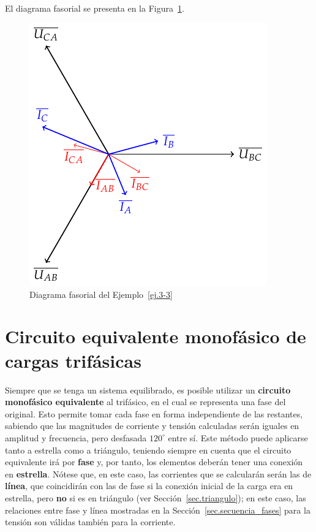 \begin{example}
\begin{align*}
          \end{align*}
          El diagrama fasorial se presenta en la
          Figura~\ref{fig.diagrama_ejemplo_3-3}.
          \begin{figure}[H]
            \centering \includegraphics{../figs/diagrama_3_3.pdf}
            \caption{Diagrama fasorial del Ejemplo~\ref{ej.3-3}}
            \label{fig.diagrama_ejemplo_3-3}
          \end{figure}
	\end{example}
	
	\section{Circuito equivalente monofásico de cargas trifásicas}\label{sec.c_eq_mon}
	 Siempre que se tenga un sistema equilibrado, es posible utilizar un \textbf{circuito monofásico equivalente} al trifásico, en el cual se representa una fase del original. Esto permite tomar cada fase en forma independiente de las restantes, sabiendo que las magnitudes de corriente y tensión calculadas serán iguales en amplitud y frecuencia, pero desfasada $120^\circ$ entre sí. Este método puede aplicarse tanto a estrella como a triángulo, teniendo siempre en cuenta que el circuito equivalente irá por \textbf{fase} y, por tanto, los elementos deberán tener una conexión en \textbf{estrella}. Nótese que, en este caso, las corrientes que se calcularán serán las de \textbf{línea}, que coincidirán con las de fase si la conexión inicial de la carga era en estrella, pero \textbf{no} si es en triángulo (ver Sección~\ref{sec.triangulo}); en este caso, las relaciones entre fase y línea mostradas en la Sección~\ref{sec.secuencia_fases} para la tensión son válidas también para la corriente.
	 
